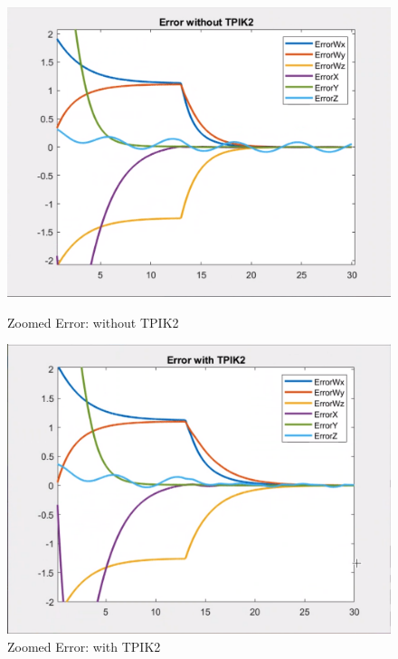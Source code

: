 \documentclass{article}
\begin{document}
\begin{figure}[htpb] 
\begin{minipage}{0.40\textwidth} 
\includegraphics[width=\textwidth]{522_3_wout_TPIK2.png} 
\caption[Zoomed Error: without TPIK2]{Zoomed Error: without TPIK2}\label{zoomed_error_wout_TPIK2} 
\end{minipage} 
\hspace{0.2\textwidth} 
\begin{minipage}{0.40\textwidth}  
\includegraphics[width=\textwidth]{522_3_w_TPIK2.png}
\caption[Zoomed Error: with TPIK2]{Zoomed Error: with TPIK2}\label{zoomed_error_w_TPIK2} 
\end{minipage}  
\end{figure}
\end{document}

